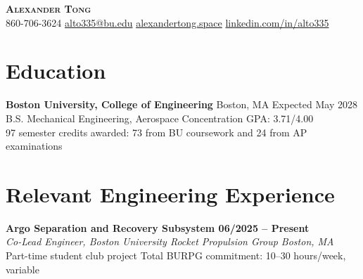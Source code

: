 \documentclass[letterpaper,11pt]{article}
\newcommand{\resumeEntry}[4]{
  {\small\textbf{#1 \textbar{} #2}}\\[-1pt]
  {\small\textit{#3}}\\[-1pt]
  {\small #4}
}
\begin{document}
\begin{center}
  {\Huge\bfseries\scshape Alexander Tong}\\[3pt]
  \small
  860-706-3624
  \enspace\textbar\enspace
  \href{mailto:alto335@bu.edu}{alto335@bu.edu}
  \enspace\textbar\enspace
  \href{https://alexandertong.space}{alexandertong.space}
  \enspace\textbar\enspace
  \href{https://www.linkedin.com/in/alto335/}
  {linkedin.com/in/alto335}
\end{center}
\vspace{-8pt}

\section{Education}

{\small
\textbf{Boston University, College of Engineering}
\textbar{} Boston, MA
\hfill Expected May 2028\\
B.S. Mechanical Engineering, Aerospace Concentration
\textbar{} GPA: 3.71/4.00
}\\
{\small
97 semester credits awarded: 73 from BU coursework and 24 from AP examinations
}

\section{Relevant Engineering Experience}

\resumeEntry
  {Argo Separation and Recovery Subsystem}
  {06/2025 -- Present}
  {Co-Lead Engineer, Boston University Rocket Propulsion Group
   \textbar{} Boston, MA}
  {Part-time student club project
   \textbar{} Total BURPG commitment: 10--30 hours/week, variable}
\end{document}
